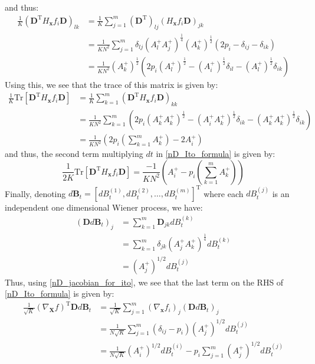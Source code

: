 and thus:
\begin{align}
\frac{1}{K}\left(\mathbf{D}^{\mathrm{T}} H_{\mathbf{x}} f_i \mathbf{D}\right)_{lk} &=\frac{1}{K}\sum\limits_{j=1}^{m}\left(\mathbf{D}^{\mathrm{T}}\right)_{lj}\left(H_{\mathbf{x}} f_i \mathbf{D}\right)_{jk}\nonumber\\
&=  \frac{1}{KN^2}\sum\limits_{j=1}^{m}\delta_{lj}\left(A^{+}_{l}A^{+}_{j}\right)^{\frac{1}{4}}(A^{+}_{k})^{\frac{1}{2}}\left(2p_i -\delta_{ij} -\delta_{ik}\right)\\
&=  \frac{1}{KN^2}(A^{+}_{k})^{\frac{1}{2}}\left(2p_i(A^{+}_{l})^{\frac{1}{2}} - (A^{+}_{i})^{\frac{1}{2}}\delta_{il} - (A^{+}_{l})^{\frac{1}{2}}\delta_{ik}\right)
\end{align}
Using this, we see that the trace of this matrix is given by:
\begin{align}
\frac{1}{K}\mathrm{Tr}[\mathbf{D}^{\mathrm{T}} H_{\mathbf{x}} f_i \mathbf{D}] &= \frac{1}{K}\sum\limits_{k=1}^{m}\left(\mathbf{D}^{\mathrm{T}} H_{\mathbf{x}} f_i \mathbf{D}\right)_{kk}\nonumber\\
&= \frac{1}{KN^2}\sum\limits_{k=1}^{m}\left(2p_i(A^{+}_{k}A^{+}_{k})^{\frac{1}{2}} - (A^{+}_{i}A^{+}_{k})^{\frac{1}{2}}\delta_{ik} - (A^{+}_{k}A^{+}_{k})^{\frac{1}{2}}\delta_{ik}\right)\\
&= \frac{1}{KN^2}\left(2p_i\left(\sum\limits_{k=1}^{m} A^{+}_k\right) - 2A^{+}_{i}\right)
\end{align}
and thus, the second term multiplying $dt$ in \eqref{nD_Ito_formula} is given by:
\begin{equation}
\frac{1}{2K}\mathrm{Tr}[\mathbf{D}^{\mathrm{T}} H_{\mathbf{x}} f_i \mathbf{D}] =  \frac{-1}{KN^2}\left(A^{+}_{i}-p_i\left(\sum\limits_{k=1}^{m} A^{+}_k\right)\right)\label{nD_for_Ito_second_term}
\end{equation}
Finally, denoting $d\mathbf{B}_t = [dB^{(1)}_t,dB^{(2)}_t, \ldots, dB^{(m)}_t]^{\mathrm{T}}$ where each $dB^{(j)}_t$ is an independent one dimensional Wiener process, we have:
\begin{align}
\left(\mathbf{D}d\mathbf{B}_t\right)_j &= \sum\limits_{k=1}^{m}\mathbf{D}_{jk}dB^{(k)}_t\nonumber\\
&= \sum\limits_{k=1}^{m}\delta_{jk}\left(A^{+}_{j}A^{+}_{k}\right)^{\frac{1}{4}}dB^{(k)}_t\\
&= \left(A^{+}_{j}\right)^{1/2}dB^{(j)}_t
\end{align}
Thus, using \eqref{nD_jacobian_for_ito}, we see that the last term on the RHS of \eqref{nD_Ito_formula} is given by:
\begin{align}
\frac{1}{\sqrt{K}}\left(\nabla_{\mathbf{X}}f\right)^{\mathrm{T}}\mathbf{D}d\mathbf{B}_t &= \frac{1}{\sqrt{K}}\sum\limits_{j=1}^{m}\left(\nabla_{\mathbf{x}} f_i\right)_j\left(\mathbf{D}d\mathbf{B}_t\right)_j\nonumber\\
&=  \frac{1}{N\sqrt{K}}\sum\limits_{j=1}^{m}\left(\delta_{ij}-p_i\right)\left(A^{+}_{j}\right)^{1/2}dB^{(j)}_t\\
&= \frac{1}{N\sqrt{K}}\left(A^{+}_{i}\right)^{1/2}dB^{(i)}_t - p_i\sum\limits_{j=1}^{m}\left(A^{+}_{j}\right)^{1/2}dB^{(j)}_t\label{nD_for_Ito_third_term}
\end{align}
